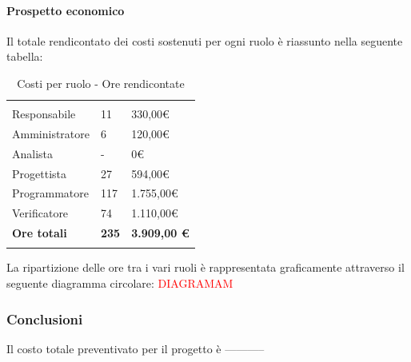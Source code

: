 			\paragraph{Prospetto economico} \Spazio
			Il totale rendicontato dei costi sostenuti per ogni ruolo è riassunto nella seguente tabella:
			\begin{table}[H]
				\centering
				\begin{tabular}{p{4cm}|C{4cm}|C{4cm}}
					
					 & &\\
					Responsabile & 11 & 330,00\euro \\
					\hline
					Amministratore& 6 & 120,00\euro \\
					\hline
					Analista & - & 0\euro \\
					\hline
					Progettista & 27 & 594,00\euro \\
					\hline
					Programmatore & 117 & 1.755,00\euro \\
					\hline
					Verificatore & 74 & 1.110,00\euro \\
					\hline
					\textbf{Ore totali} & \textbf{235} & \textbf{3.909,00 \euro} \\
				\end{tabular}
				\caption{Costi per ruolo - Ore rendicontate}
			\end{table}
		
			La ripartizione delle ore tra i vari ruoli è rappresentata graficamente attraverso il seguente diagramma circolare:
			\textcolor{red}{DIAGRAMAM}
			
			\subsubsection{Conclusioni}
			
			Il costo totale preventivato per il progetto è -----------
